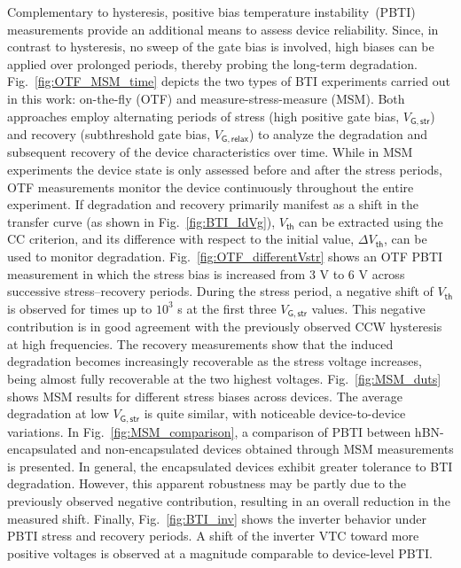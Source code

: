 \documentclass[conference]{IEEEtran}
\begin{document}
Complementary to hysteresis, positive bias temperature instability~(PBTI) measurements provide an additional means to assess device reliability. Since, in contrast to hysteresis, no sweep of the gate bias is involved, high biases can be applied over prolonged periods, thereby probing the long-term degradation. Fig.~\ref{fig:OTF_MSM_time} depicts the two types of BTI experiments carried out in this work: on-the-fly (OTF) and measure-stress-measure (MSM). Both approaches employ alternating periods of stress (high positive gate bias, $V_\mathsf{G,str}$) and recovery (subthreshold gate bias, $V_\mathsf{G,relax}$) to analyze the degradation and subsequent recovery of the device characteristics over time. While in MSM experiments the device state is only assessed before and after the stress periods, OTF measurements monitor the device continuously throughout the entire experiment. If degradation and recovery primarily manifest as a shift in the transfer curve (as shown in Fig.~\ref{fig:BTI_IdVg}), $V_\mathsf{th}$ can be extracted using the CC criterion, and its difference with respect to the initial value, $\Delta V_\mathsf{th}$, can be used to monitor degradation.
Fig.~\ref{fig:OTF_differentVstr} shows an OTF PBTI measurement in which the stress bias is increased from 3 V to 6 V across successive stress–recovery periods. During the stress period, a negative shift of $V_\mathsf{th}$ is observed for times up to $10^3$ s at the first three $V_\mathsf{G,str}$ values. This negative contribution is in good agreement with the previously observed CCW hysteresis at high frequencies. The recovery measurements show that the induced degradation becomes increasingly recoverable as the stress voltage increases, being almost fully recoverable at the two highest voltages. Fig.~\ref{fig:MSM_duts} shows MSM results for different stress biases across devices. The average degradation at low $V_\mathsf{G,str}$ is quite similar, with noticeable device-to-device variations. 
In Fig.~\ref{fig:MSM_comparison}, a comparison of PBTI between hBN-encapsulated and non-encapsulated devices obtained through MSM measurements is presented. In general, the encapsulated devices exhibit greater tolerance to BTI degradation. However, this apparent robustness may be partly due to the previously observed negative contribution, resulting in an overall reduction in the measured shift. Finally, Fig.~\ref{fig:BTI_inv} shows the inverter behavior under PBTI stress and recovery periods. A shift of the inverter VTC toward more positive voltages is observed at a magnitude comparable to device-level PBTI.
\end{document}
